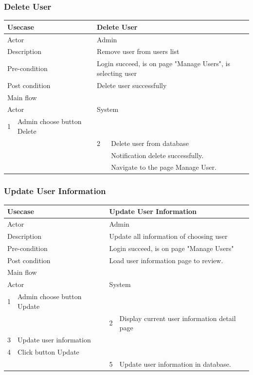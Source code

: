 \documentclass[a4paper]{article}
\begin{document}
\subsubsection{Delete User}
\begin{tabular}{|l|p{5cm}||l|p{5cm}|}
	\hline 
	\multicolumn{2}{|p{5cm}|}{Usecase} & \multicolumn{2}{|p{5cm}|}{Delete User}\\ 
	\hline 
	\multicolumn{2}{|p{5cm}|}{Actor} & \multicolumn{2}{|p{5cm}|}{Admin} \\ 
	\hline 
	\multicolumn{2}{|p{5cm}|}{Description} & \multicolumn{2}{|p{5cm}|}{Remove user from users list}\\
	\hline
	\multicolumn{2}{|p{5cm}|}{Pre-condition} & \multicolumn{2}{|p{5cm}|}{Login succeed, is on page "Manage Users", is selecting user}\\
	\hline
	\multicolumn{2}{|p{5cm}|}{Post condition} & \multicolumn{2}{|p{5cm}|}{Delete user successfully} \\
	\hline
	\multicolumn{4}{|l|}{Main flow} \\
	\hline
	\multicolumn{2}{|p{5cm}|}{Actor} & \multicolumn{2}{|p{5cm}|}{System} \\
	\hline
	1 & Admin choose button Delete & & \\
	\hline
 	& & 2 & Delete user from database \\
	& &  &Notification delete successfully.\\
	& & &Navigate to the page Manage User. \\	
	\hline 	
\end{tabular}
\subsubsection{Update User Information}
\begin{tabular}{|l|p{5cm}||l|p{5cm}|}
	\hline 
	\multicolumn{2}{|p{5cm}|}{Usecase} & \multicolumn{2}{|p{5cm}|}{Update User Information}\\ 
	\hline 
	\multicolumn{2}{|p{5cm}|}{Actor} & \multicolumn{2}{|p{5cm}|}{Admin} \\ 
	\hline 
	\multicolumn{2}{|p{5cm}|}{Description} & \multicolumn{2}{|p{5cm}|}{Update all information of choosing user}\\
	\hline
	\multicolumn{2}{|p{5cm}|}{Pre-condition} & \multicolumn{2}{|p{5cm}|}{Login succeed, is on page "Manage Users"}\\
	\hline
	\multicolumn{2}{|p{5cm}|}{Post condition} & \multicolumn{2}{|p{5cm}|}{Load user information page to review.} \\
	\hline
	\multicolumn{4}{|l|}{Main flow} \\
	\hline
	\multicolumn{2}{|p{5cm}|}{Actor} & \multicolumn{2}{|p{5cm}|}{System} \\
	\hline
	1 & Admin choose button Update & & \\
	\hline
	& & 2 & Display current user information detail page \\
	\hline
	3 & Update user information & & \\
	\hline
	4 & Click button Update & & \\
	\hline	
	& & 5 &Update user information in database. \\	
	\hline 			
\end{tabular}
\end{document}
